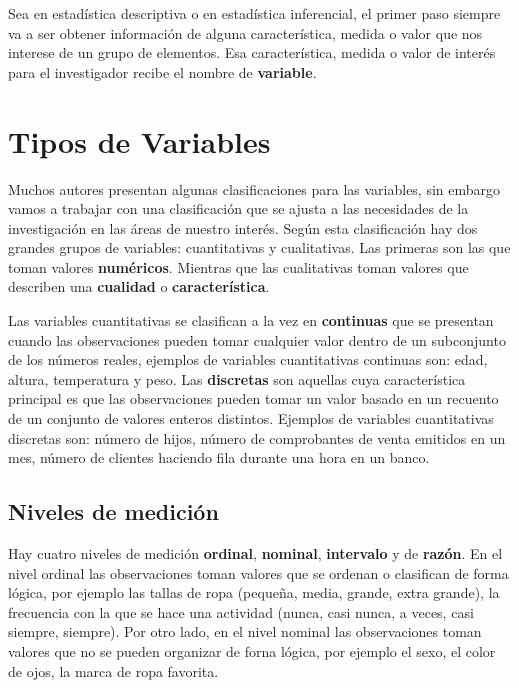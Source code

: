 \documentclass[]{book}
\begin{document}
Sea en estadística descriptiva o en estadística inferencial, el primer paso siempre va a ser obtener información de alguna característica, medida o valor que nos interese de un grupo de elementos. Esa característica, medida o valor de interés para el investigador recibe el nombre de \textbf{variable}.

\hypertarget{tipos-de-variables}{%
\section{Tipos de Variables}\label{tipos-de-variables}}

Muchos autores presentan algunas clasificaciones para las variables, sin embargo vamos a trabajar con una clasificación que se ajusta a las necesidades de la investigación en las áreas de nuestro interés. Según esta clasificación hay dos grandes grupos de variables: cuantitativas y cualitativas. Las primeras son las que toman valores \textbf{numéricos}. Mientras que las cualitativas toman valores que describen una \textbf{cualidad} o \textbf{característica}.

Las variables cuantitativas se clasifican a la vez en \textbf{continuas} que se presentan cuando las observaciones pueden tomar cualquier valor dentro de un subconjunto de los números reales, ejemplos de variables cuantitativas continuas son: edad, altura, temperatura y peso. Las \textbf{discretas} son aquellas cuya característica principal es que las observaciones pueden tomar un valor basado en un recuento de un conjunto de valores enteros distintos. Ejemplos de variables cuantitativas discretas son: número de hijos, número de comprobantes de venta emitidos en un mes, número de clientes haciendo fila durante una hora en un banco.

\hypertarget{niveles-de-medicion}{%
\subsection{Niveles de medición}\label{niveles-de-medicion}}

Hay cuatro niveles de medición \textbf{ordinal}, \textbf{nominal}, \textbf{intervalo} y de \textbf{razón}. En el nivel ordinal las observaciones toman valores que se ordenan o clasifican de forma lógica, por ejemplo las tallas de ropa (pequeña, media, grande, extra grande), la frecuencia con la que se hace una actividad (nunca, casi nunca, a veces, casi siempre, siempre). Por otro lado, en el nivel nominal las observaciones toman valores que no se pueden organizar de forna lógica, por ejemplo el sexo, el color de ojos, la marca de ropa favorita.
\end{document}
